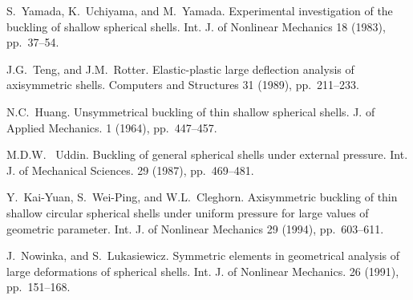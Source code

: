 
\begin{thebibliography}{10}
{\sc S.~Yamada, K.~Uchiyama, and  M.~Yamada}. {Experimental investigation of the buckling of shallow spherical shells}. Int. J. of Nonlinear  Mechanics 18  (1983), pp.~37--54.

{\sc J.G.~Teng, and J.M.~Rotter}. {Elastic-plastic large deflection analysis of axisymmetric shells}. Computers and Structures 31 (1989), pp.~211--233.

{\sc N.C.~Huang}. {Unsymmetrical buckling of thin shallow spherical shells}. J. of Applied Mechanics. 1 (1964), pp.~447--457.

{\sc M.D.W. ~Uddin}. {Buckling of general spherical shells under external pressure}. Int. J. of Mechanical Sciences.  29 (1987), pp.~469--481.

{\sc Y.~Kai-Yuan, S.~Wei-Ping, and W.L.~Cleghorn}. {Axisymmetric buckling of thin shallow circular spherical shells under uniform pressure for large values of geometric parameter}. Int. J. of Nonlinear Mechanics 29 (1994), pp.~603--611.

{\sc J.~Nowinka, and S.~Lukasiewicz}. {Symmetric elements in geometrical analysis of large deformations of spherical shells}. Int. J. of Nonlinear Mechanics. 26 (1991), pp.~151--168.
\end{thebibliography}